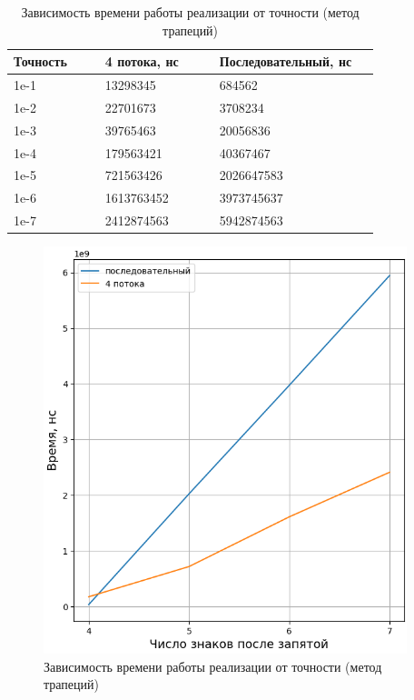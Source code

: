 \clearpage

\begin{table}[h]
    \begin{center}
    \begin{threeparttable}
        \captionsetup{justification=raggedright}
        \caption{\label{tab:eps-trapez}Зависимость времени работы реализации от точности (метод трапеций)}
        \begin{tabular}{|p{0.2\linewidth}|p{0.25\linewidth}|p{0.35\linewidth}|}
            \hline
            \bfseries Точность & \bfseries 4 потока, нс & \bfseries Последовательный, нс \\
            \hline
            1e-1 & 13298345 & 684562 \\
            \hline
            1e-2 & 22701673 & 3708234 \\
            \hline
            1e-3 & 39765463 & 20056836 \\
            \hline
            1e-4 & 179563421 & 40367467 \\
            \hline
            1e-5 & 721563426 & 2026647583 \\
            \hline
            1e-6 & 1613763452 & 3973745637 \\
            \hline
            1e-7 & 2412874563 & 5942874563 \\
            \hline
        \end{tabular}
    \end{threeparttable}
    \end{center}
\end{table} 

\begin{figure}[h!btp]
	\centering
	\includegraphics[width=300pt]{inc/gr4.png}
	\caption{Зависимость времени работы реализации от точности (метод трапеций)}
	\label{fig:gr4}	
\end{figure}

